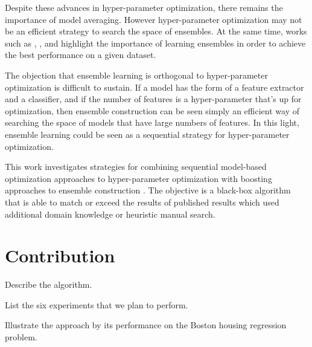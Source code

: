 \documentclass[11pt,twocolumn]{article}
\begin{document}
\vspace{11pt}
Despite these advances in hyper-parameter optimization, there remains
the importance of model averaging.  However hyper-parameter optimization
may not be an efficient strategy to search the space of ensembles.  At
the same time, works such as \citet{gehler}, \citet{coates+lee+ng:2010},
and \citet{fg11} highlight the importance of learning ensembles in
order to achieve the best performance on a given dataset.

\vspace{11pt}
The objection that ensemble learning is orthogonal to hyper-parameter
optimization is difficult to sustain.  If a model has the form of
a feature extractor and a classifier, and if the number of features is
a hyper-parameter that's up for optimization, then ensemble construction
can be seen simply an efficient way of searching the space of models
that have large numbers of features.  In this light, ensemble learning
could be seen as a sequential strategy for hyper-parameter optimization.

\vspace{11pt}
This work investigates strategies for combining sequential model-based
optimization approaches to hyper-parameter optimization with boosting
approaches to ensemble construction \citep{mason,friedman}.  The
objective is a black-box algorithm that is able to match or exceed the
results of published results which used additional domain knowledge or
heuristic manual search.

\section{Contribution}

Describe the algorithm.

List the six experiments that we plan to perform.

Illustrate the approach by its performance on the Boston housing regression problem.
\end{document}
